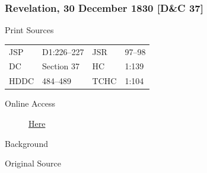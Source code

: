 		\subsubsection{Revelation, 30 December 1830 [D\&C 37]}
			\label{EMS-1830-JS-30-DEC-1830}
		
			\begin{description}
				\item[Print Sources]
			\end{description}

				\begin{tabular}{p{0.5in}p{1in}p{0.5in}p{1in}}
				JSP	 	& D1:226--227	& JSR 		& 97--98 \\
				DC	 	& Section 37	& HC 		& 1:139 \\
				HDDC 	& 484--489		& TCHC 		& 1:104 \\
				\end{tabular}
			
			\begin{description}
				\item[Online Access] \href{https://www.josephsmithpapers.org/paper-summary/revelation-30-december-1830-dc-37/1}{Here}
			\end{description}
			
			\begin{description}
				\item[Background]
			\end{description}
			
			
			\begin{description}
				\item[Original Source]
			\end{description}
			
			
